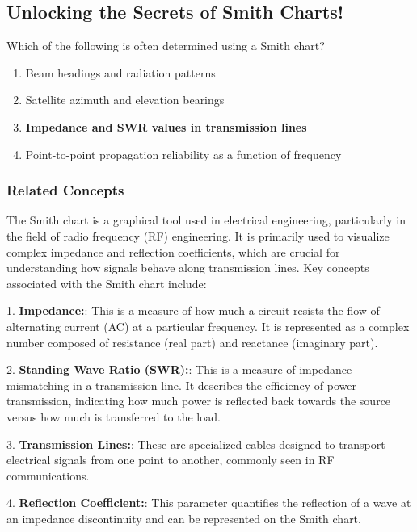 \subsection{Unlocking the Secrets of Smith Charts!}

\begin{tcolorbox}[colback=gray!10, colframe=black, title=E9G03] Which of the following is often determined using a Smith chart?
\begin{enumerate}[label=\Alph*.]
    \item Beam headings and radiation patterns
    \item Satellite azimuth and elevation bearings
    \item \textbf{Impedance and SWR values in transmission lines}
    \item Point-to-point propagation reliability as a function of frequency
\end{enumerate} \end{tcolorbox}

\subsubsection{Related Concepts}

The Smith chart is a graphical tool used in electrical engineering, particularly in the field of radio frequency (RF) engineering. It is primarily used to visualize complex impedance and reflection coefficients, which are crucial for understanding how signals behave along transmission lines. Key concepts associated with the Smith chart include:

1. \textbf{Impedance:}: This is a measure of how much a circuit resists the flow of alternating current (AC) at a particular frequency. It is represented as a complex number composed of resistance (real part) and reactance (imaginary part).

2. \textbf{Standing Wave Ratio (SWR):}: This is a measure of impedance mismatching in a transmission line. It describes the efficiency of power transmission, indicating how much power is reflected back towards the source versus how much is transferred to the load.

3. \textbf{Transmission Lines:}: These are specialized cables designed to transport electrical signals from one point to another, commonly seen in RF communications.

4. \textbf{Reflection Coefficient:}: This parameter quantifies the reflection of a wave at an impedance discontinuity and can be represented on the Smith chart.

